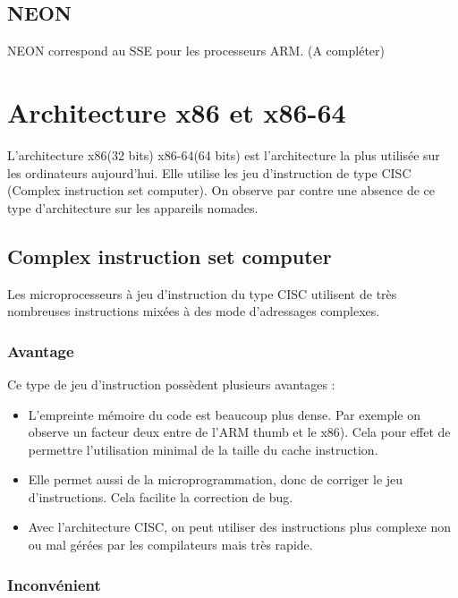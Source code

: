 \subsection{ NEON }

NEON correspond au SSE pour les processeurs ARM. (A compléter)


\clearpage

\section{ Architecture x86 et x86-64 }

L'architecture x86(32 bits) x86-64(64 bits) est l'architecture la plus utilisée sur les ordinateurs aujourd'hui. Elle utilise les jeu d'instruction de type CISC (Complex instruction set computer). On observe par contre une absence de ce type d'architecture sur les appareils nomades. 

\subsection{ Complex instruction set computer }

Les microprocesseurs à jeu d'instruction du type CISC utilisent de très nombreuses instructions mixées à des mode d'adressages complexes. 

\subsubsection{ Avantage }

Ce type de jeu d'instruction possèdent plusieurs avantages :
\begin{itemize}
	\item L'empreinte mémoire du code est beaucoup plus dense. Par exemple on observe un facteur deux entre de l'ARM thumb et le x86). Cela pour effet de permettre l'utilisation minimal de la taille du cache instruction.
	\item Elle permet aussi de la microprogrammation, donc de corriger le jeu d'instructions. Cela facilite la correction de bug.
	\item Avec l'architecture CISC, on peut utiliser des instructions plus complexe non ou mal gérées par les compilateurs mais très rapide.
\end{itemize}

\subsubsection{ Inconvénient }

